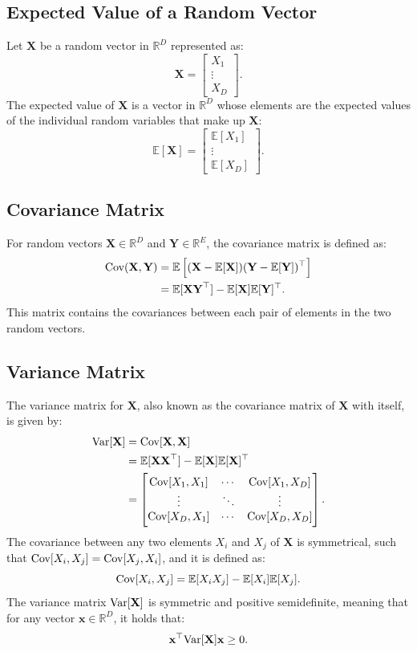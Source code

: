 \documentclass[12pt,openany]{book}
\theoremstyle{definition}
\newcommand{\E}{\mathbb{E}}
\newcommand{\Cov}{\textnormal{Cov}}
\newcommand{\Var}{\textnormal{Var}}
\renewcommand{\vec}[1]{\textbf{#1}}
\begin{document}
	\subsection{Expected Value of a Random Vector}
	Let \( \vec{X} \) be a random vector in \( \mathbb{R}^D \) represented as:
	\[
	\vec{X} = \begin{bmatrix}
		X_1 \\
		\vdots \\
		X_D
	\end{bmatrix}.
	\]
	The expected value of \( \vec{X} \) is a vector in \( \mathbb{R}^D \) whose elements are the expected values of the individual random variables that make up \( \vec{X} \):
	\[
	\E[\vec{X}] = \begin{bmatrix}
		\E[X_1] \\
		\vdots \\
		\E[X_D]
	\end{bmatrix}.
	\]
	
	\subsection{Covariance Matrix}
	For random vectors \( \vec{X} \in \mathbb{R}^D \) and \( \vec{Y} \in \mathbb{R}^E \), the covariance matrix is defined as:
	\begin{align*}
		\Cov(\vec{X},\vec{Y}) &= \E\left[(\vec{X} - \E[\vec{X}])(\vec{Y} - \E[\vec{Y}])^\top\right] \\
		&= \E[\vec{X}\vec{Y}^\top] - \E[\vec{X}]\E[\vec{Y}]^\top.
	\end{align*}
	This matrix contains the covariances between each pair of elements in the two random vectors.
	
	\subsection{Variance Matrix}
	The variance matrix for \( \vec{X} \), also known as the covariance matrix of \( \vec{X} \) with itself, is given by:
	\begin{align*}
		\Var[\vec{X}] &= \Cov[\vec{X},\vec{X}] \\
		&= \E[\vec{X}\vec{X}^\top] - \E[\vec{X}]\E[\vec{X}]^\top \\
		&= \begin{bmatrix}
			\Cov[X_1,X_1] & \cdots & \Cov[X_1,X_D] \\
			\vdots & \ddots & \vdots \\
			\Cov[X_D,X_1] & \cdots & \Cov[X_D,X_D] \\
		\end{bmatrix}.
	\end{align*}
	The covariance between any two elements \( X_i \) and \( X_j \) of \( \vec{X} \) is symmetrical, such that \( \Cov[X_i,X_j] = \Cov[X_j,X_i] \), and it is defined as:
	\[
	\Cov[X_i,X_j] = \E[X_iX_j] - \E[X_i]\E[X_j].
	\]
	The variance matrix \( \Var[\vec{X}] \) is symmetric and positive semidefinite, meaning that for any vector \( \vec{x} \in \mathbb{R}^D \), it holds that:
	\[
	\vec{x}^\top \Var[\vec{X}] \vec{x} \geq 0.
	\]
	
\end{document}
